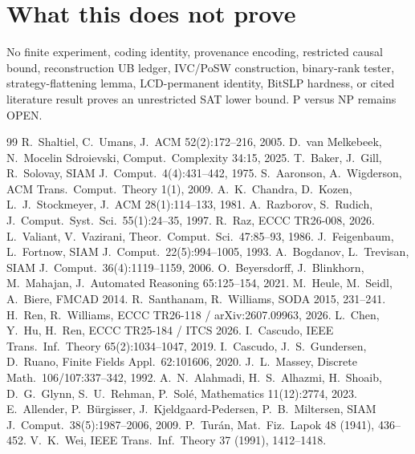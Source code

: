 \documentclass[11pt]{article}
\begin{document}
\section*{What this does not prove}
No finite experiment, coding identity, provenance encoding, restricted causal bound,
reconstruction UB ledger, IVC/PoSW construction, binary-rank tester, strategy-flattening lemma,
LCD-permanent identity, BitSLP hardness, or cited literature result proves an unrestricted SAT
lower bound. P versus NP remains OPEN.

\begin{thebibliography}{99}
 R.~Shaltiel, C.~Umans, J.~ACM 52(2):172--216, 2005.
 D.~van Melkebeek, N.~Mocelin Sdroievski, Comput.\ Complexity 34:15, 2025.
 T.~Baker, J.~Gill, R.~Solovay, SIAM J.\ Comput.\ 4(4):431--442, 1975.
 S.~Aaronson, A.~Wigderson, ACM Trans.\ Comput.\ Theory 1(1), 2009.
 A.~K.~Chandra, D.~Kozen, L.~J.~Stockmeyer, J.~ACM 28(1):114--133, 1981.
 A.~Razborov, S.~Rudich, J.\ Comput.\ Syst.\ Sci.\ 55(1):24--35, 1997.
 R.~Raz, ECCC TR26-008, 2026.
 L.~Valiant, V.~Vazirani, Theor.\ Comput.\ Sci.\ 47:85--93, 1986.
 J.~Feigenbaum, L.~Fortnow, SIAM J.\ Comput.\ 22(5):994--1005, 1993.
 A.~Bogdanov, L.~Trevisan, SIAM J.\ Comput.\ 36(4):1119--1159, 2006.
 O.~Beyersdorff, J.~Blinkhorn, M.~Mahajan, J.\ Automated Reasoning 65:125--154, 2021.
 M.~Heule, M.~Seidl, A.~Biere, FMCAD 2014.
 R.~Santhanam, R.~Williams, SODA 2015, 231--241.
 H.~Ren, R.~Williams, ECCC TR26-118 / arXiv:2607.09963, 2026.
 L.~Chen, Y.~Hu, H.~Ren, ECCC TR25-184 / ITCS 2026.
 I.~Cascudo, IEEE Trans.\ Inf.\ Theory 65(2):1034--1047, 2019.
 I.~Cascudo, J.~S.~Gundersen, D.~Ruano, Finite Fields Appl.\ 62:101606, 2020.
 J.~L.~Massey, Discrete Math.\ 106/107:337--342, 1992.
 A.~N.~Alahmadi, H.~S.~Alhazmi, H.~Shoaib, D.~G.~Glynn, S.~U.~Rehman, P.~Sol\'e,
Mathematics 11(12):2774, 2023.
 E.~Allender, P.~B\"urgisser, J.~Kjeldgaard-Pedersen, P.~B.~Miltersen,
SIAM J.\ Comput.\ 38(5):1987--2006, 2009.
 P.~Tur\'an, Mat.\ Fiz.\ Lapok 48 (1941), 436--452.
 V.~K.~Wei, IEEE Trans.\ Inf.\ Theory 37 (1991), 1412--1418.
\end{thebibliography}

\end{document}
